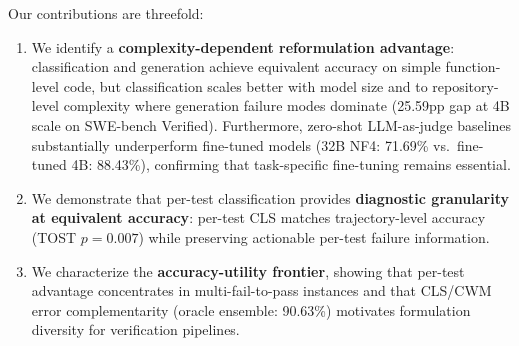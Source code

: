 Our contributions are threefold:
\begin{enumerate}
    \item We identify a \textbf{complexity-dependent reformulation advantage}: classification and generation achieve equivalent accuracy on simple function-level code, but classification scales better with model size and to repository-level complexity where generation failure modes dominate (25.59pp gap at 4B scale on SWE-bench Verified). Furthermore, zero-shot LLM-as-judge baselines substantially underperform fine-tuned models (32B NF4: 71.69\% vs.\ fine-tuned 4B: 88.43\%), confirming that task-specific fine-tuning remains essential.
    \item We demonstrate that per-test classification provides \textbf{diagnostic granularity at equivalent accuracy}: per-test CLS matches trajectory-level accuracy (TOST $p = 0.007$) while preserving actionable per-test failure information.
    \item We characterize the \textbf{accuracy-utility frontier}, showing that per-test advantage concentrates in multi-fail-to-pass instances and that CLS/CWM error complementarity (oracle ensemble: 90.63\%) motivates formulation diversity for verification pipelines.
\end{enumerate}

